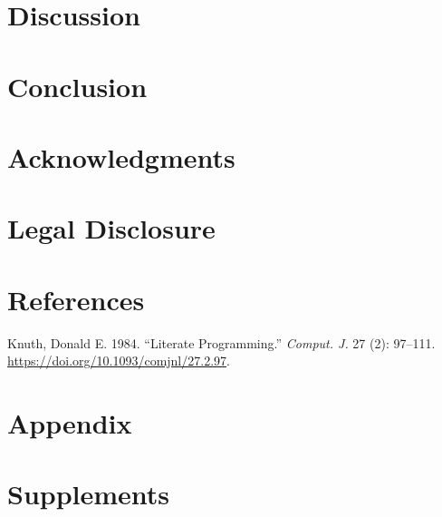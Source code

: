 \documentclass[
  letterpaper,
  DIV=11,
  numbers=noendperiod]{scrartcl}
\newlength{\cslhangindent}
\newenvironment{CSLReferences}[2] %
 {\begin{list}{}{%
  \setlength{\itemindent}{0pt}
  \setlength{\leftmargin}{0pt}
  \setlength{\parsep}{0pt}
  \ifodd #1
   \setlength{\leftmargin}{\cslhangindent}
   \setlength{\itemindent}{-1\cslhangindent}
  \fi
  \setlength{\itemsep}{#2\baselineskip}}}
 {\end{list}}
\begin{document}
\section{Discussion}\label{discussion}

\section{Conclusion}\label{conclusion}

\section{Acknowledgments}\label{acknowledgments}

\section{Legal Disclosure}\label{legal-disclosure}

\section*{References}\label{references}

\label{refs}
\begin{CSLReferences}{1}{0}
Knuth, Donald E. 1984. {``Literate Programming.''} \emph{Comput. J.} 27
(2): 97--111. \url{https://doi.org/10.1093/comjnl/27.2.97}.

\end{CSLReferences}

\section{Appendix}\label{appendix}

\section{Supplements}\label{supplements}
\end{document}
